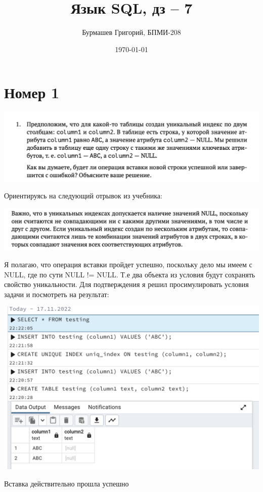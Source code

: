 \documentclass[a4paper,12pt]{article}
\author{Бурмашев Григорий, БПМИ-208}
\title{Язык SQL, дз -- 7}
\date{\today}
\begin{document}
\maketitle
\section*{Номер 1}
\begin{center}
\includegraphics[scale=0.6]{t1.png}
\end{center}
Ориентируясь на следующий отрывок из учебника:
\begin{center}
\includegraphics[scale=0.6]{11.png}
\end{center}
Я полагаю, что операция вставки пройдет успешно, поскольку дело мы имеем с NULL, где по сути NULL != NULL. Т.е два объекта из условия будут сохранять свойство уникальности. Для подтверждения я решил просимулировать условия задачи и посмотреть на результат:
\begin{center}
\includegraphics[scale=0.7]{12.png}
\end{center}
Вставка действительно прошла успешно
\clearpage
\end{document}
